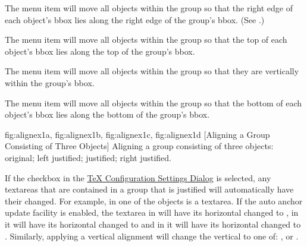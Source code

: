 
The  menu item will move all objects
within the \gls{group} so that the right edge of each object's \gls*{bbox}
lies along the right edge of the group's \gls*{bbox}.  (See
.)


The  menu item will move all objects
within the \gls{group} so that the top of each object's \gls*{bbox} lies along the
top of the group's \gls*{bbox}.


The  menu item will move all objects
within the \gls{group} so that they are  vertically
within the group's \gls{bbox}.


The  menu item will move all objects
within the \gls{group} so that the bottom of each object's \gls*{bbox} lies
along the bottom of the group's \gls*{bbox}.

{
  {fig:alignex1a}{}{},
  {fig:alignex1b}{}{},
  {fig:alignex1c}{}{},
  {fig:alignex1d}{}{}
}
[Aligning a Group Consisting of Three Objects]
{Aligning a group consisting of three objects: 
 original; 
 left justified; 
  justified; 
 right justified.}

If the  \gls{checkbox} in the
\hyperref[sec:texconfig]{TeX Configuration Settings Dialog} is
selected, any \glspl{textarea} that are contained in a group that is
justified will automatically have their  changed.
For example, in  one of the objects is a
\gls*{textarea}.  If the auto anchor update facility is enabled, the
\gls*{textarea} in  will have its
horizontal  changed to ,
in  it will have its horizontal
 changed to  and in
 it will have its horizontal
 changed to . Similarly,
applying a vertical alignment will change the vertical
 to one of: ,
 or .

